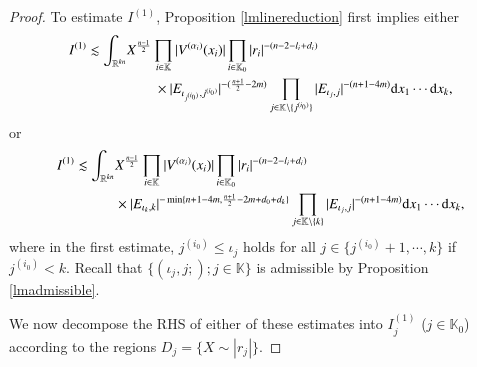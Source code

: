 \documentclass[11pt,reqno]{amsart}
\def\d{{\rm d}}
\numberwithin{equation}{section}
\theoremstyle{definition}
\begin{document}
\begin{proof}
	To estimate $I^{(1)}$, Proposition \ref{lmlinereduction} first implies either
	\begin{equation}\label{I1decom1}
		\begin{split}
			I^{(1)}\lesssim\int_{\mathbb{R}^{kn}}&X^\frac{n-1}{2}\prod_{i\in\mathbb{K}}|V^{(\alpha_i)}(x_i)|\prod_{i\in\mathbb{K}_0}|r_i|^{-(n-2-l_i+d_i)}\\
			&\quad\quad\times|E_{\iota_{j^{(i_0)}},j^{(i_0)}}|^{-(\frac{n+1}{2}-2m)}\prod_{j\in\mathbb{K}\setminus\{j^{(i_0)}\}}|E_{\iota_j,j}|^{-(n+1-4m)}\d x_1\cdots \d x_k,
		\end{split}
	\end{equation}
	or
	\begin{equation}\label{I1decom2}
		\begin{split}
			I^{(1)}\lesssim\int_{\mathbb{R}^{kn}}&X^\frac{n-1}{2}\prod_{i\in\mathbb{K}}|V^{(\alpha_i)}(x_i)|\prod_{i\in\mathbb{K}_0}|r_i|^{-(n-2-l_i+d_i)}\\
			&\times|E_{\iota_k,k}|^{-\min\{n+1-4m,\frac{n+1}{2}-2m+d_0+d_k\}}\prod_{j\in\mathbb{K}\setminus\{k\}}|E_{\iota_j,j}|^{-(n+1-4m)}\d x_1\cdots \d x_k,
		\end{split}
	\end{equation}
	where in the first estimate, $j^{(i_0)}\leq\iota_j$ holds for all $j\in\{j^{(i_0)}+1,\cdots,k\}$ if $j^{(i_0)}<k$. Recall that $\{(\iota_j,j;);j\in\mathbb{K}\}$ is admissible by Proposition \ref{lmadmissible}.
	
	We now decompose the RHS of either of these estimates into $I^{(1)}_j$ ($j\in\mathbb{K}_0$) according to the regions $D_j=\{X\sim|r_j|\}$.
	

\end{proof}
\end{document}
